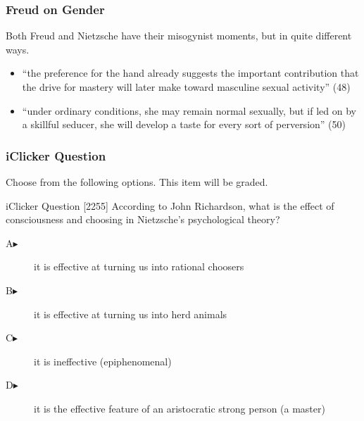 \documentclass[xcolor=dvipsnames]{beamer}
\begin{document}
\begin{frame}
  \frametitle{Freud on Gender}
  Both Freud and Nietzsche have their misogynist moments, but in quite
  different ways. 
  \begin{itemize}
  \item ``the preference for the hand already suggests the important
    contribution that the drive for mastery will later make toward
    masculine sexual activity'' (48)
  \item ``under ordinary conditions, she may remain normal sexually,
    but if led on by a skillful seducer, she will develop a taste for
    every sort of perversion'' (50)
  \end{itemize}
\end{frame}

\begin{frame}
  \frametitle{iClicker Question}
Choose from the following options. This item will be graded.
\begin{block}{iClicker Question}
[2255] According to John Richardson, what is the effect of
consciousness and choosing in Nietzsche's psychological theory?
\end{block}
\begin{description}
\item[A\hspace{.2in}$\blacktriangleright$] it is effective at turning us into rational choosers
\item[B\hspace{.2in}$\blacktriangleright$] it is effective at turning us into herd animals
\item[C\hspace{.2in}$\blacktriangleright$] it is ineffective (epiphenomenal)
\item[D\hspace{.2in}$\blacktriangleright$] it is the effective feature of an aristocratic strong person (a master)
\end{description}
\end{frame}
\end{document}
